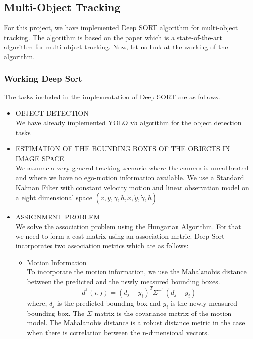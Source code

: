 \documentclass[conference]{IEEEtran}
\begin{document}
\subsection{Multi-Object Tracking}
For this project, we have implemented Deep SORT algorithm for multi-object tracking. The algorithm is based on the paper \cite{Deep_sort} which is a state-of-the-art algorithm for multi-object tracking. Now, let us look at the working of the algorithm.

\subsubsection*{\textbf{Working Deep Sort}}
The tasks included in the implementation of Deep SORT are as follows:\\
\begin{itemize}
  \item OBJECT DETECTION \\
        We have already implemented YOLO v5 algorithm for the object detection tasks


  \item ESTIMATION OF THE BOUNDING BOXES OF THE OBJECTS IN IMAGE SPACE \\
        We assume a very general tracking scenario where the camera is uncalibrated and where we have no ego-motion information available. We use a Standard Kalman Filter with constant velocity motion and linear observation model on a eight dimensional space $(x,y,\gamma, h, \dot{x}, \dot{y}, \dot{\gamma}, \dot{h}) $

  \item ASSIGNMENT PROBLEM\\
        We solve the association problem using the Hungarian Algorithm. For that we need to form a cost matrix using an association metric. Deep Sort incorporates two association metrics which are as follows:
        \begin{itemize}
          \item Motion Information \\
                To incorporate the motion information, we use the Mahalanobis distance between the predicted and the newly measured bounding boxes.
                \begin{equation*}
                  d^1(i,j) = (d_j - y_i)^T \Sigma^{-1} (d_j - y_i)
                \end{equation*}
                where, $d_j$ is the predicted bounding box and $y_i$ is the newly measured bounding box. The $\Sigma$ matrix is the covariance matrix of the motion model. The Mahalanobis distance is a robust distance metric in the case when there is correlation between the n-dimensional vectors.


\end{itemize}
\end{itemize}
\end{document}
